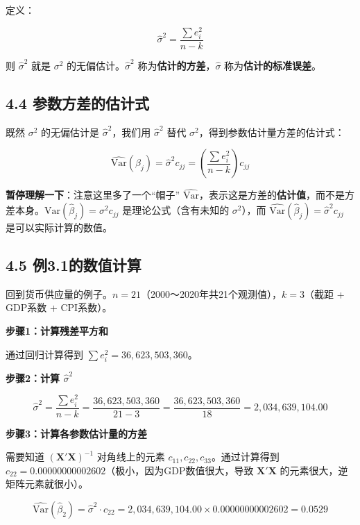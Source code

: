 \documentclass[12pt,a4paper]{ctexart}
\begin{document}
定义：

\begin{equation}
\hat{\sigma}^2 = \frac{\sum e_i^2}{n - k} \tag{3.36}
\end{equation}

则 $\hat{\sigma}^2$ 就是 $\sigma^2$ 的无偏估计。$\hat{\sigma}^2$ 称为\textbf{估计的方差}，$\hat{\sigma}$ 称为\textbf{估计的标准误差}。

\subsection{4.4 参数方差的估计式}

既然 $\sigma^2$ 的无偏估计是 $\hat{\sigma}^2$，我们用 $\hat{\sigma}^2$ 替代 $\sigma^2$，得到参数估计量方差的估计式：

\begin{equation}
\widehat{\text{Var}}(\hat{\beta}_j) = \hat{\sigma}^2 c_{jj} = \left(\frac{\sum e_i^2}{n-k}\right) c_{jj} \tag{3.37}
\end{equation}

\textbf{暂停理解一下}：注意这里多了一个“帽子” $\widehat{\text{Var}}$，表示这是方差的\textbf{估计值}，而不是方差本身。$\text{Var}(\hat{\beta}_j) = \sigma^2 c_{jj}$ 是理论公式（含有未知的 $\sigma^2$），而 $\widehat{\text{Var}}(\hat{\beta}_j) = \hat{\sigma}^2 c_{jj}$ 是可以实际计算的数值。

\subsection{4.5 例3.1的数值计算}

回到货币供应量的例子。$n = 21$（2000～2020年共21个观测值），$k = 3$（截距 + GDP系数 + CPI系数）。

\textbf{步骤1：计算残差平方和}

通过回归计算得到 $\sum e_i^2 = 36{,}623{,}503{,}360$。

\textbf{步骤2：计算 $\hat{\sigma}^2$}

\[
\hat{\sigma}^2 = \frac{\sum e_i^2}{n-k} = \frac{36{,}623{,}503{,}360}{21 - 3} = \frac{36{,}623{,}503{,}360}{18} = 2{,}034{,}639{,}104.00
\]

\textbf{步骤3：计算各参数估计量的方差}

需要知道 $(\mathbf{X}'\mathbf{X})^{-1}$ 对角线上的元素 $c_{11}, c_{22}, c_{33}$。通过计算得到 $c_{22} = 0.00000000002602$（极小，因为GDP数值很大，导致 $\mathbf{X}'\mathbf{X}$ 的元素很大，逆矩阵元素就很小）。

\[
\widehat{\text{Var}}(\hat{\beta}_2) = \hat{\sigma}^2 \cdot c_{22} = 2{,}034{,}639{,}104.00 \times 0.00000000002602 = 0.0529
\]
\end{document}
